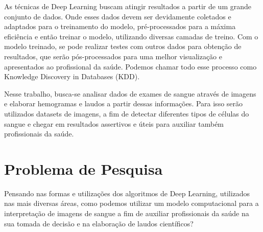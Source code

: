 As técnicas de Deep Learning buscam atingir resultados a partir de um grande conjunto de dados. Onde esses dados devem ser devidamente coletados e adaptados para o treinamento do modelo, pré-processados para a máxima eficiência e então treinar o modelo, utilizando diversas camadas de treino. Com o modelo treinado, se pode realizar testes com outros dados para obtenção de resultados, que serão pós-processados para uma melhor visualização e apresentados ao profissional da saúde. Podemos chamar todo esse processo como Knowledge Discovery in Databases (KDD).

Nesse trabalho, busca-se analisar dados de exames de sangue através de imagens e elaborar hemogramas e laudos a partir dessas informações. Para isso serão utilizados datasets de imagens, a fim de detectar diferentes tipos de células do sangue e chegar em resultados assertivos e úteis para auxiliar também profissionais da saúde.



\section{Problema de Pesquisa}
\label{sec:problema}

Pensando nas formas e utilizações dos algoritmos de Deep Learning, utilizados nas mais diversas áreas, como podemos utilizar um modelo computacional para a interpretação de imagens de sangue a fim de auxiliar profissionais da saúde na sua tomada de decisão e na elaboração de laudos científicos?


